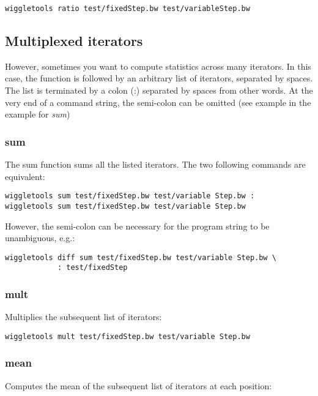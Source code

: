 \documentclass[12pt]{article}
\begin{document}
\begin{verbatim}
wiggletools ratio test/fixedStep.bw test/variableStep.bw 
\end{verbatim}

\subsection{Multiplexed iterators}

However, sometimes you want to compute statistics across many iterators. In this case, the function is followed by an arbitrary list of iterators, separated by spaces. The list is terminated by a colon (:) separated by spaces from other words. At the very end of a command string, the semi-colon can be omitted (see example in the example for \emph{sum})

\subsubsection{sum}

The sum function sums all the listed iterators. The two following commands are equivalent:

\begin{verbatim}
wiggletools sum test/fixedStep.bw test/variable Step.bw :
wiggletools sum test/fixedStep.bw test/variable Step.bw
\end{verbatim}

However, the semi-colon can be necessary for the program string to be unambiguous, e.g.:

\begin{verbatim}
wiggletools diff sum test/fixedStep.bw test/variable Step.bw \
            : test/fixedStep
\end{verbatim}

\subsubsection{mult}

Multiplies the subsequent list of iterators:

\begin{verbatim}
wiggletools mult test/fixedStep.bw test/variable Step.bw 
\end{verbatim}

\subsubsection{mean}

Computes the mean of the subsequent list of iterators at each position:
\end{document}
